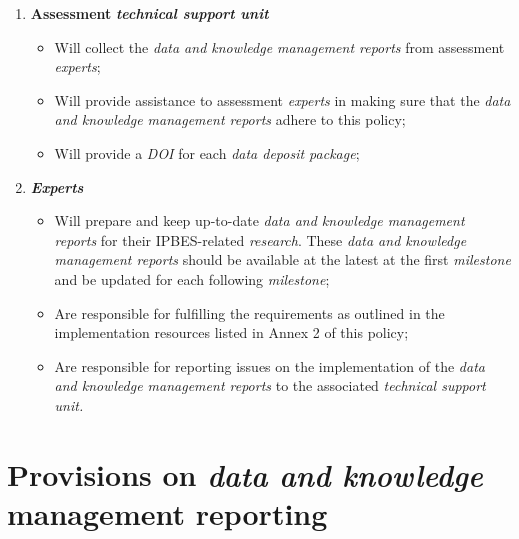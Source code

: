 \documentclass{article}
\begin{document}
\begin{enumerate}[label=(\alph*)]
    \item \textbf{Assessment }\textit{\textbf{technical support unit}}
    \begin{itemize}
        \item Will collect the \textit{data and knowledge management reports} from assessment \textit{experts};
        \item Will provide assistance to assessment \textit{experts} in making sure that the \textit{data and knowledge management reports} adhere to this policy;
        \item Will provide a \textit{DOI} for each \textit{data deposit package};
    \end{itemize}

    \item \textit{\textbf{Experts}}
    \begin{itemize}
        \item Will prepare and keep up-to-date \textit{data and knowledge management reports} for their IPBES-related \textit{research}. These \textit{data and knowledge management reports} should be available at the latest at the first \textit{milestone} and be updated for each following \textit{milestone};
        \item Are responsible for fulfilling the requirements as outlined in the implementation resources listed in Annex 2 of this policy;
        \item Are responsible for reporting issues on the implementation of the \textit{data and knowledge management reports} to the associated \textit{technical support unit.}
    \end{itemize}
\end{enumerate}

\section*{Provisions on \textit{\textbf{data and knowledge}}\textbf{ management reporting}}
\end{document}
